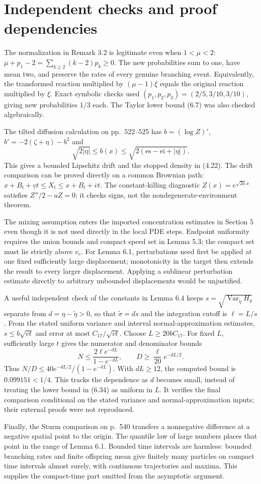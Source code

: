 \documentclass[10pt]{article}
\begin{document}
\section*{Independent checks and proof dependencies}
The normalization in Remark 3.2 is legitimate even when \(1<\mu<2\): \(\mu+p_1-2=\sum_{k\ge2}(k-2)p_k\ge0\). The new probabilities sum to one, have mean two, and preserve the rates of every genuine branching event. Equivalently, the transformed reaction multiplied by \((\mu-1)\xi\) equals the original reaction multiplied by \(\xi\). Exact symbolic checks used \((p_1,p_2,p_3)=(2/5,3/10,3/10)\), giving new probabilities \(1/3\) each. The Taylor lower bound (6.7) was also checked algebraically.\par
The tilted diffusion calculation on pp. 522–525 has \(b=(\log Z)'\), \(b'=-2(\zeta+\eta)-b^2\) and \[\sqrt{2|\eta|}\le b(x)\le\sqrt{2(\mathrm{es}-\mathrm{ei}+|\eta|)}.\] This gives a bounded Lipschitz drift and the stopped density in (4.22). The drift comparison can be proved directly on a common Brownian path: \(x+B_t+\underline v t\le X_t\le x+B_t+\overline v t\). The constant-killing diagnostic \(Z(x)=e^{\sqrt{2a}x}\) satisfies \(Z''/2-aZ=0\); it checks signs, not the nondegenerate-environment theorem.\par
The mixing assumption enters the imported concentration estimates in Section 5 even though it is not used directly in the local PDE steps. Endpoint uniformity requires the union bounds and compact speed set in Lemma 5.3; the compact set must lie strictly above \(v_c\). For Lemma 6.1, perturbations need first be applied at one fixed sufficiently large displacement; monotonicity in the target then extends the result to every larger displacement. Applying a sublinear perturbation estimate directly to arbitrary unbounded displacements would be unjustified.\par
A useful independent check of the constants in Lemma 6.4 keeps \(s=\sqrt{\operatorname{Var}_{\widetilde\eta}H_y}\) separate from \(d=\eta-\widetilde\eta>0\), so that \(\widetilde\sigma=ds\) and the integration cutoff is \(\ell=L/s\). From the stated uniform variance and interval normal-approximation estimates, \(s\le b\sqrt{vt}\) and error at most \(C_{17}/\sqrt{vt}\). Choose \(L\ge20bC_{17}\). For fixed \(L\), sufficiently large \(t\) gives the numerator and denominator bounds \[N\le\frac{2\ell e^{-dL}}{1-e^{-dL}},\qquad
D\ge\frac{\ell}{20}e^{-dL/2}.\] Thus \(N/D\le40e^{-dL/2}/(1-e^{-dL})\). With \(dL\ge12\), the computed bound is \(0.099151<1/4\). This tracks the dependence as \(d\) becomes small, instead of treating the lower bound in (6.34) as uniform in \(L\). It verifies the final comparison conditional on the stated variance and normal-approximation inputs; their external proofs were not reproduced.\par
Finally, the Sturm comparison on p. 540 transfers a nonnegative difference at a negative spatial point to the origin. The quantile law of large numbers places that point in the range of Lemma 6.1. Bounded time intervals are harmless: bounded branching rates and finite offspring mean give finitely many particles on compact time intervals almost surely, with continuous trajectories and maxima. This supplies the compact-time part omitted from the asymptotic argument.\par
\end{document}
